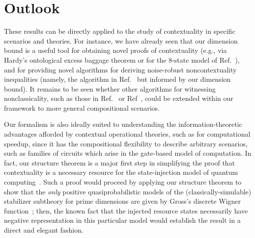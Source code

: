 \documentclass[onecolum,aps,groupedaddress,nofootinbib]{revtex4-2}
\newcommand{\rob}{\color{cyan}}
\newcommand{\blk}{\color{black}}
\begin{document}
\section{Outlook}


These results can be directly applied to the study of contextuality in specific scenarios and theories. For instance, we have already seen that our dimension bound is a useful tool for obtaining novel proofs of contextuality (e.g., via Hardy's ontological excess baggage theorem \cite{Hardy2004} or for the 8-state model of Ref.~\cite{8state}), and for providing novel algorithms for deriving noise-robust noncontextuality inequalities (namely, the algorithm in Ref.~\cite{schmid2019characterization} but informed by our dimension bound).
 It remains to be seen whether other algorithms for witnessing nonclassicality, such as those in Ref.~\cite{Schmid2018} or Ref~\cite{Krishna_2017}, could be extended within our framework to more general compositional scenarios.

Our formalism is also ideally suited to understanding the information-theoretic advantages afforded by  contextual operational theories, such as for computational speedup, since it has the compositional flexibility to describe arbitrary scenarios, such as families of circuits which arise in the gate-based model of computation.
In fact, our structure theorem is a major first step in simplifying the proof that contextuality is a necessary resource for the state-injection model of quantum computing~\cite{magic}. Such a proof would proceed by applying our structure theorem to show that the {\em only} positive quasiprobabilistic models of the (classically-simulable) stabilizer subtheory for prime dimensions are given by Gross's discrete Wigner function~\cite{Grossunique}; then, the known fact that the injected resource states necessarily have negative representation in this particular model would establish the result in a direct and elegant fashion.
\end{document}
